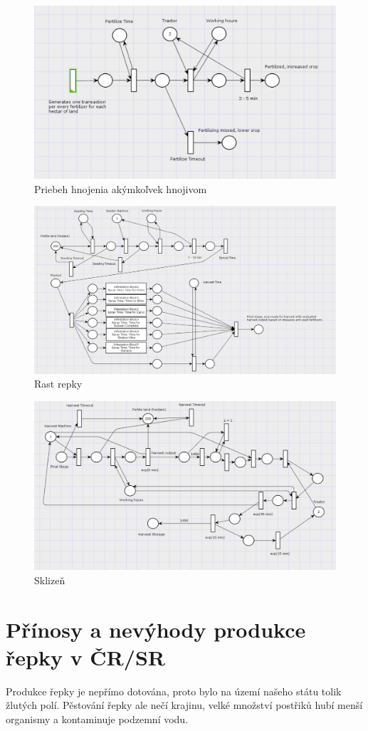 \documentclass[11pt,a4paper,titlepage]{article}
\begin{document}
\begin{figure}[ht!]
\centering
\includegraphics[scale=0.3]{img/Fertilization.png}
\caption{Priebeh hnojenia akýmkoľvek hnojivom}
\end{figure}

\begin{figure}[ht!]
\centering
\includegraphics[scale=0.25]{img/Growing.png}
\caption{Rast repky}
\end{figure}

\begin{figure}[ht!]
\centering
\includegraphics[scale=0.25]{img/Harvest.png}
\caption{Sklizeň}
\end{figure}


\section{Přínosy a nevýhody produkce řepky v ČR/SR}
Produkce řepky je nepřímo dotována, proto bylo na území našeho státu tolik žlutých polí.
Pěstování řepky ale nečí krajinu, velké množství postřiků hubí menší organismy a kontaminuje podzemní vodu.


\newpage

\end{document}
